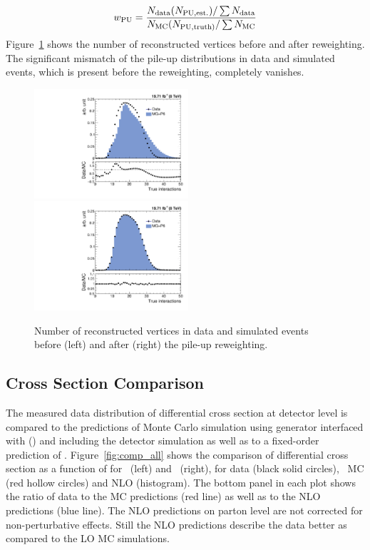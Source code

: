 \begin{equation}
 {w_{\rm PU} = \frac {N_{\rm data} (N_{\rm PU,est.})/\sum N_{\rm data}} {N_{\rm MC} (N_{\rm PU,truth)}/\sum N_{\rm MC}}}
\end{equation}
Figure~\ref{fig:pileup} shows the number of reconstructed vertices before and after reweighting. The significant mismatch of the pile-up distributions in data and simulated events, which is present before the reweighting, completely vanishes. 

\begin{figure}[!htbp]
 \begin{center}
 \includegraphics[width=0.51\textwidth]{Plots_HT_2_150/Nvertices.pdf}%
 ~~\includegraphics[width=0.51\textwidth]{Plots_HT_2_150/Nvertices_weight.pdf}
 \caption{Number of reconstructed vertices in data and simulated events before (left) and after (right) the pile-up reweighting.}
 \label{fig:pileup}
 \end{center}
\end{figure}

\subsection{Cross Section Comparison}
The measured data distribution of differential cross section at detector level is compared to the predictions of Monte Carlo simulation using \MadGraphF generator interfaced with \PYTHIAS (\MGP) and including the detector simulation as well as to a fixed-order prediction of \NLOJETPP. Figure~\ref{fig:comp_all} shows the comparison of differential cross section as a function of \httwo for \njt~(left) and \njth~(right), for data (black solid circles), \MGP~MC (red hollow circles) and NLO (histogram). The bottom panel in each plot shows the ratio of data to the MC predictions (red line) as well as to the NLO predictions (blue line). The NLO predictions on parton level are not corrected for non-perturbative effects. Still the NLO predictions describe the data better as compared to the LO MC simulations.

